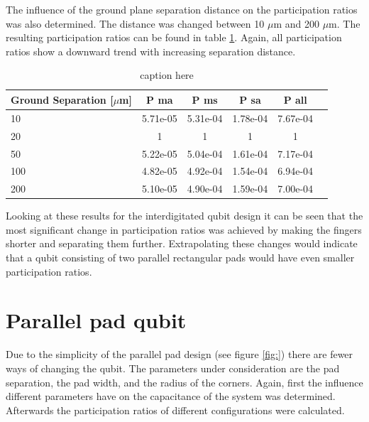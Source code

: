 The influence of the ground plane separation distance on the participation ratios was also determined. The distance was changed between 10 \(\mu\)m and 200 \(\mu\)m. The resulting participation ratios can be found in table \ref{table:ratio_groundseparation}. Again, all participation ratios show a downward trend with increasing separation distance. 

\begin{table}
	\begin{center}
		\begin{tabular}{ | l || c | c | c | c | c |}
			\hline
			Ground Separation [\(\mu\)m] & P ma & P ms & P sa & P all \\ \hline
			10 & 5.71e-05 & 5.31e-04 & 1.78e-04 & 7.67e-04 \\
			20 & 1 & 1 & 1 & 1 \\
			50 & 5.22e-05 & 5.04e-04 & 1.61e-04 & 7.17e-04 \\
			100 & 4.82e-05 & 4.92e-04 & 1.54e-04 & 6.94e-04 \\
			200 & 5.10e-05 & 4.90e-04 & 1.59e-04 & 7.00e-04\\
			\hline
		\end{tabular}
	\end{center}
	\caption{caption here}
	\label{table:ratio_groundseparation}
\end{table}

Looking at these results for the interdigitated qubit design it can be seen that the most significant change in participation ratios was achieved by making the fingers shorter and separating them further. Extrapolating these changes would indicate that a qubit consisting of two parallel rectangular pads would have even smaller participation ratios.


\section{Parallel pad qubit}
Due to the simplicity of the parallel pad design (see figure \ref{fig:}) there are fewer ways of changing the qubit. The parameters under consideration are the pad separation, the pad width, and the radius of the corners. Again, first the influence different parameters have on the capacitance of the system was determined. Afterwards the participation ratios of different configurations were calculated.
